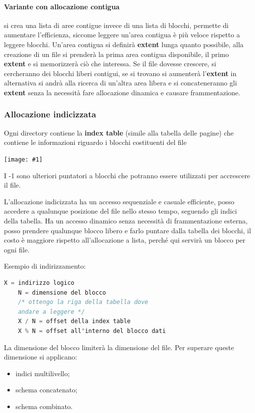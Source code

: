 \documentclass[a4paper, 12pt]{book}
\newcommand{\foto}[1]{\texttt{[image: \#1]}}
\begin{document}
\paragraph{Variante con allocazione contigua} si crea una 
lista di aree contigue invece di una lista di blocchi, 
permette di aumentare l'efficienza, siccome leggere un'area 
contigua è più veloce rispetto a leggere blocchi. Un'area 
contigua si definirà \textbf{extent} lunga quanto possibile, 
alla creazione di un file si prenderà la prima area contigua disponibile,
il primo \textbf{extent} e si memorizzerà ciò che interessa.
Se il file dovesse crescere, si cercheranno dei blocchi 
liberi contigui, se si trovano si aumenterà l'\textbf{extent} in 
alternativa si andrà alla ricerca di un'altra area libera 
e si concateneranno gli \textbf{extent} senza la necessità 
fare allocazione dinamica e causare frammentazione.

\subsubsection{Allocazione indicizzata}

Ogni directory contiene la \textbf{index table} (simile 
alla tabella delle pagine) che contiene le 
informazioni riguardo i blocchi costituenti del file
\begin{center}
    \foto{index_table.png}
\end{center}
I -1 sono ulteriori puntatori a blocchi che potranno essere 
utilizzati per accrescere il file.

L'allocazione indicizzata ha un accesso sequenziale e casuale efficiente, 
posso accedere a qualunque posizione del file nello stesso tempo, 
seguendo gli indici della tabella. Ha un accesso dinamico
senza necessità di frammentazione esterna, posso prendere 
qualunque blocco libero e farlo puntare dalla tabella dei 
blocchi, il costo è maggiore rispetto all'allocazione 
a lista, perché qui servirà un blocco per ogni file.

Esempio di indirizzamento:
\begin{lstlisting}[language=C]
    X = indirizzo logico
    N = dimensione del blocco
    /* ottengo la riga della tabella dove
    andare a leggere */
    X / N = offset della index table
    X % N = offset all'interno del blocco dati
\end{lstlisting}

La dimensione del blocco limiterà la dimensione del file.
Per superare queste dimensione si applicano:
\begin{itemize}
    \item indici multilivello;
    \item schema concatenato;
    \item schema combinato.
\end{itemize}
\end{document}
